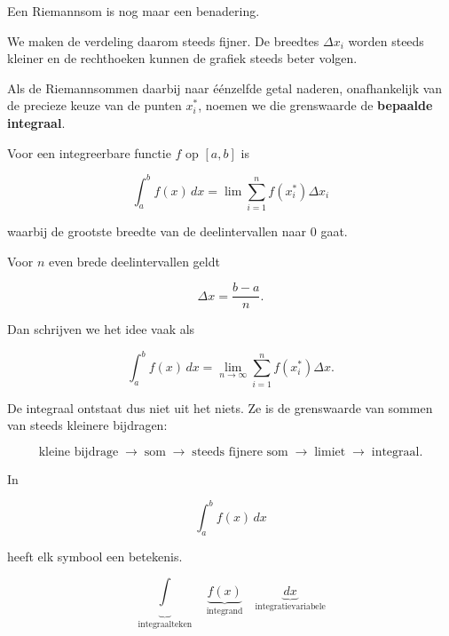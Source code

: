\documentclass{ximera}
\begin{document}


Een Riemannsom is nog maar een benadering.

We maken de verdeling daarom steeds fijner. De breedtes
\(\Delta x_i\) worden steeds kleiner en de rechthoeken kunnen de grafiek
steeds beter volgen.

Als de Riemannsommen daarbij naar éénzelfde getal naderen, onafhankelijk
van de precieze keuze van de punten \(x_i^\ast\), noemen we die
grenswaarde de \textbf{bepaalde integraal}.

\begin{definitie}
Voor een integreerbare functie \(f\) op \([a,b]\) is

\[
\boxed{
\int_a^b f(x)\,dx
=
\lim
\sum_{i=1}^{n}f(x_i^\ast)\Delta x_i
}
\]

waarbij de grootste breedte van de deelintervallen naar \(0\) gaat.
\end{definitie}

Voor \(n\) even brede deelintervallen geldt

\[
\Delta x=\frac{b-a}{n}.
\]

Dan schrijven we het idee vaak als

\[
\boxed{
\int_a^b f(x)\,dx
=
\lim_{n\to\infty}
\sum_{i=1}^{n}f(x_i^\ast)\Delta x
}.
\]

De integraal ontstaat dus niet uit het niets. Ze is de grenswaarde van
sommen van steeds kleinere bijdragen:

\[
\text{kleine bijdrage}
\;\longrightarrow\;
\text{som}
\;\longrightarrow\;
\text{steeds fijnere som}
\;\longrightarrow\;
\text{limiet}
\;\longrightarrow\;
\text{integraal}.
\]




In

\[
\int_a^b f(x)\,dx
\]

heeft elk symbool een betekenis.

\[
\underbrace{\int}_{\text{integraalteken}}
\quad
\underbrace{f(x)}_{\text{integrand}}
\quad
\underbrace{dx}_{\text{integratievariabele}}
\]
\end{document}
